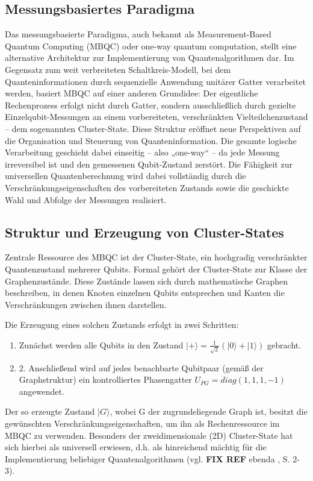\subsection{Messungsbasiertes Paradigma}
Das messungsbasierte Paradigma, auch bekannt als Measurement-Based Quantum Computing (MBQC) oder one-way quantum computation, stellt eine alternative Architektur zur Implementierung von Quantenalgorithmen dar. Im Gegensatz zum weit verbreiteten Schaltkreis-Modell, bei dem Quanteninformationen durch sequenzielle Anwendung unitärer Gatter verarbeitet werden, basiert MBQC auf einer anderen Grundidee: Der eigentliche Rechenprozess erfolgt nicht durch Gatter, sondern ausschließlich durch gezielte Einzelqubit-Messungen an einem vorbereiteten, verschränkten Vielteilchenzustand – dem sogenannten Cluster-State.
Diese Struktur eröffnet neue Perspektiven auf die Organisation und Steuerung von Quanteninformation. Die gesamte logische Verarbeitung geschieht dabei einseitig – also „one-way“ – da jede Messung irreversibel ist und den gemessenen Qubit-Zustand zerstört. Die Fähigkeit zur universellen Quantenberechnung wird dabei vollständig durch die Verschränkungseigenschaften des vorbereiteten Zustands sowie die geschickte Wahl und Abfolge der Messungen realisiert. \autocite[2-4]{briegel_measurement-based_2009}
\subsection*{Struktur und Erzeugung von Cluster-States}
Zentrale Ressource des MBQC ist der Cluster-State, ein hochgradig verschränkter Quantenzustand mehrerer Qubits. Formal gehört der Cluster-State zur Klasse der Graphenzustände. Diese Zustände lassen sich durch mathematische Graphen beschreiben, in denen Knoten einzelnen Qubits entsprechen und Kanten die Verschränkungen zwischen ihnen darstellen.

Die Erzeugung eines solchen Zustands erfolgt in zwei Schritten:
\begin{enumerate}
    \item 	Zunächst werden alle Qubits in den Zustand $|+\rangle = \frac{1}{\sqrt{2}}(|0\rangle + |1\rangle)$ gebracht.
    \item 2.	Anschließend wird auf jedes benachbarte Qubitpaar (gemäß der Graphstruktur) ein kontrolliertes Phasengatter $U_{PG}=diag(1,1,1,-1)$ angewendet.
\end{enumerate}
Der so erzeugte Zustand $|G\rangle$, wobei G der zugrundeliegende Graph ist, besitzt die gewünschten Verschränkungseigenschaften, um ihn als Rechenressource im MBQC zu verwenden. Besonders der zweidimensionale (2D) Cluster-State hat sich hierbei als universell erwiesen, d.h. als hinreichend mächtig für die Implementierung beliebiger Quantenalgorithmen (vgl. \textbf{FIX REF} ebenda \citeyear{h_j_briegel_measurement-based_2009}, S. 2-3).
